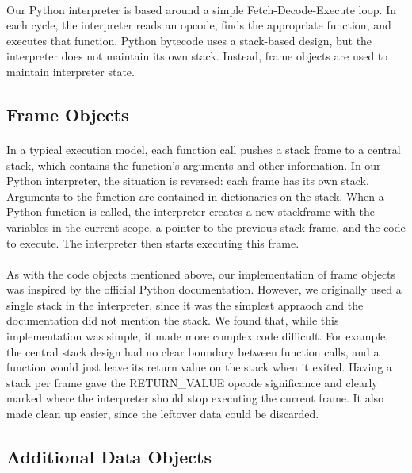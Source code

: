 \documentclass{article}
\begin{document}
\paragraph{}
Our Python interpreter is based around a simple Fetch-Decode-Execute loop. In each cycle, the interpreter reads an opcode, finds the appropriate function, and executes that function. Python bytecode uses a stack-based design, but the interpreter does not maintain its own stack. Instead, frame objects are used to maintain interpreter state.

\subsection{Frame Objects}\label{py-frameobject}
\paragraph{}
In a typical execution model, each function call pushes a stack frame to a central stack, which contains the function's arguments and other information. In our Python interpreter, the situation is reversed: each frame has its own stack. Arguments to the function are contained in dictionaries on the stack. When a Python function is called, the interpreter creates a new stackframe with the variables in the current scope, a pointer to the previous stack frame, and the code to execute. The interpreter then starts executing this frame.

\paragraph{}
As with the code objects mentioned above, our implementation of frame objects was inspired by the official Python documentation. However, we originally used a single stack in the interpreter, since it was the simplest appraoch and the documentation did not mention the stack. We found that, while this implementation was simple, it made more complex code difficult. For example, the central stack design had no clear boundary between function calls, and a function would just leave its return value on the stack when it exited. Having a stack per frame gave the RETURN\_VALUE opcode significance and clearly marked where the interpreter should stop executing the current frame. It also made clean up easier, since the leftover data could be discarded.

\subsection{Additional Data Objects}
\end{document}
